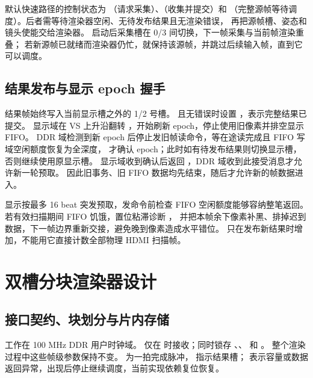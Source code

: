 默认快速路径的控制状态为
（请求采集）、（收集并提交）和
（完整源帧等待调度）。后者需等待渲染器空闲、无待发布结果且无渲染错误，
再把源帧槽、姿态和镜头使能交给渲染器。
启动后采集槽在 0/3 间切换，下一帧采集与当前帧渲染重叠；
若新源帧已就绪而渲染器仍忙，就保持该源帧，并跳过后续输入帧，直到它可以调度。


\subsection{结果发布与显示 epoch 握手}
结果帧始终写入当前显示槽之外的 1/2 号槽。
 且无错误时设置 ，表示完整结果已提交。
显示域在 VS 上升沿翻转 ，开始刷新 epoch，停止使用旧像素并排空显示 FIFO。
DDR 域检测到新 epoch 后停止发旧帧读命令，等在途读完成且 FIFO 写域空闲额度恢复为全深度，
才确认 epoch；此时如有待发布结果则切换显示槽，否则继续使用原显示槽。
显示域收到确认后返回 ，DDR 域收到此接受消息才允许新一轮预取。
因此旧事务、旧 FIFO 数据均先结束，随后才允许新的帧数据进入。

显示按最多 16 beat 突发预取，发命令前检查 FIFO 空闲额度能够容纳整笔返回。
若有效扫描期间 FIFO 饥饿，置位粘滞诊断 ，
并把本帧余下像素补黑、排掉迟到数据，下一帧边界重新交接，避免晚到像素造成水平错位。
 只在发布新结果时增加，不能用它直接计数全部物理 HDMI 扫描帧。

\section{双槽分块渲染器设计}
\subsection{接口契约、块划分与片内存储}
 工作在 100 MHz DDR 用户时钟域。
 仅在  时接收；同时锁存
、、
 和 。
整个渲染过程中这些帧级参数保持不变。
 为一拍完成脉冲， 指示结果槽；
 表示容量或数据返回异常，出现后停止继续调度，当前实现依赖复位恢复。

